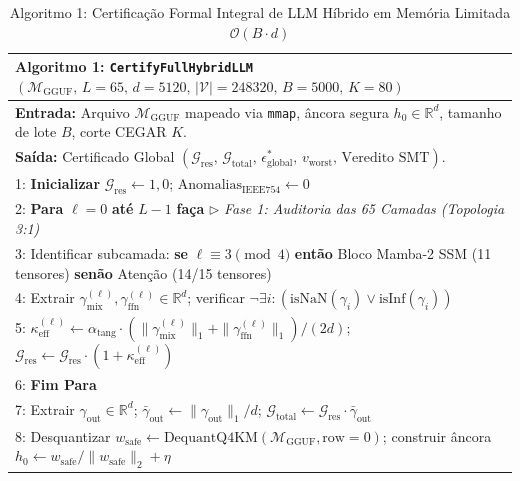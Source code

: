 \documentclass[11pt,a4paper]{article}
\theoremstyle{definition}
\begin{document}
\begin{table}[!ht]
\centering
\footnotesize
\caption{Algoritmo 1: Certificação Formal Integral de LLM Híbrido em Memória Limitada $\mathcal{O}(B \cdot d)$}
\label{alg:certify_full_llm}
\begin{tabularx}{\linewidth}{X}
\toprule
\textbf{Algoritmo 1:} \texttt{CertifyFullHybridLLM}$(\mathcal{M}_{\text{GGUF}},\, L=65,\, d=5120,\, |\mathcal{V}|=248320,\, B=5000,\, K=80)$ \\
\midrule
\textbf{Entrada:} Arquivo $\mathcal{M}_{\text{GGUF}}$ mapeado via \texttt{mmap}, âncora segura $h_0 \in \mathbb{R}^d$, tamanho de lote $B$, corte CEGAR $K$. \\
\textbf{Saída:} Certificado Global $(\mathcal{G}_{\text{res}},\, \mathcal{G}_{\text{total}},\, \epsilon_{\text{global}}^*,\, v_{\text{worst}},\, \text{Veredito SMT})$. \\[0.08cm]
1: \textbf{Inicializar} $\mathcal{G}_{\text{res}} \gets 1{,}0$; \quad $\text{Anomalias}_{\text{IEEE754}} \gets 0$ \\
2: \textbf{Para} $\ell = 0$ \textbf{até} $L - 1$ \textbf{faça} \hfill $\triangleright$ \textit{Fase 1: Auditoria das 65 Camadas (Topologia 3:1)} \\
3: \hspace{0.5cm} Identificar subcamada: \textbf{se} $\ell \equiv 3 \pmod 4$ \textbf{então} Bloco Mamba-2 SSM (11 tensores) \textbf{senão} Atenção (14/15 tensores) \\
4: \hspace{0.5cm} Extrair $\gamma_{\text{mix}}^{(\ell)}, \gamma_{\text{ffn}}^{(\ell)} \in \mathbb{R}^d$; verificar $\neg\exists i : (\text{isNaN}(\gamma_i) \lor \text{isInf}(\gamma_i))$ \\
5: \hspace{0.5cm} $\kappa_{\text{eff}}^{(\ell)} \gets \alpha_{\text{tang}} \cdot \left(\|\gamma_{\text{mix}}^{(\ell)}\|_1 + \|\gamma_{\text{ffn}}^{(\ell)}\|_1\right) / (2d)$; \quad $\mathcal{G}_{\text{res}} \gets \mathcal{G}_{\text{res}} \cdot \left(1 + \kappa_{\text{eff}}^{(\ell)}\right)$ \\
6: \textbf{Fim Para} \\
7: Extrair $\gamma_{\text{out}} \in \mathbb{R}^d$; \quad $\bar{\gamma}_{\text{out}} \gets \|\gamma_{\text{out}}\|_1 / d$; \quad $\mathcal{G}_{\text{total}} \gets \mathcal{G}_{\text{res}} \cdot \bar{\gamma}_{\text{out}}$ \\
8: Desquantizar $w_{\text{safe}} \gets \text{DequantQ4KM}(\mathcal{M}_{\text{GGUF}}, \text{row}=0)$; construir âncora $h_0 \gets w_{\text{safe}}/\|w_{\text{safe}}\|_2 + \eta$ \\

\end{tabularx}
\end{table}
\end{document}
